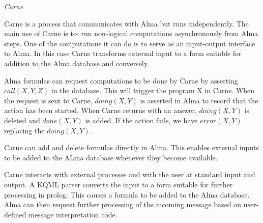 {\em Carne}

Carne is a process that communicates with Alma but runs
independently. The main use of Carne is to: run non-logical
computations asynchronously from Alma steps. One of the computations
it can do is to serve as an input-output interface to Alma. In this
case Carne transforms external input to a form suitable for addition
to the Alma database and conversely.

Alma formulas can request computations to be done by Carne by
asserting $call(X, Y, Z)$ in the database. This will trigger the
program X in Carne. When the request is sent to Carne, $doing(X, Y)$
is asserted in Alma to record that the action has been started. When
Carne returns with an answer, $doing(X, Y)$ is deleted and $done(X,
Y)$ is added. If the action fails, we have $error(X, Y)$ replacing the
$doing(X, Y)$.

Carne can add and delete formulas directly in Alma. This enables
external inputs to be added to the ALma database whenever they become
available.

Carne interacts with external processes and with the user at standard
input and output. A KQML parser converts the input to a form suitable
for further processing in prolog. This causes a formula to be added to
the Alma database. Alma can then request further processing of the
incoming message based on user-defined message interpretation code.

